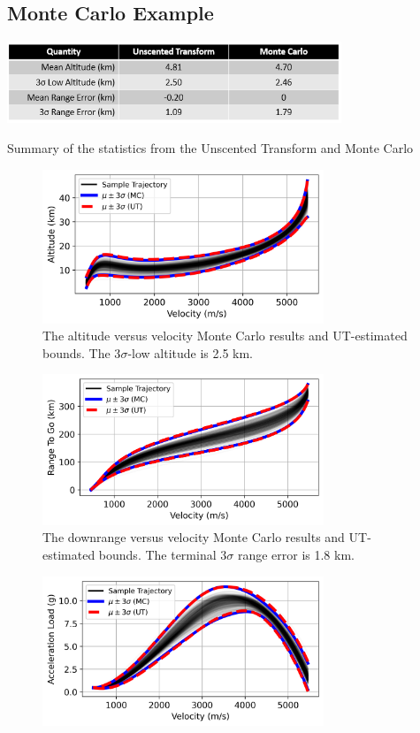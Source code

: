 \documentclass[journal ]{new-aiaa}
\begin{document}
\subsection*{Monte Carlo Example}
\begin{table}[h!]
	\centering
	\includegraphics[width=0.75\textwidth]{ddp/table_mc}
	\caption{Summary of the statistics from the Unscented Transform and Monte Carlo}
	\label{table_mc}
\end{table}
\begin{figure}[h!]
	\centering
	\includegraphics[width=0.75\textwidth]{ddp/python/Altitude}
	\caption{The altitude versus velocity Monte Carlo results and UT-estimated bounds. The 3$ \sigma $-low altitude is 2.5 km.}
	\label{fig_mc_alt}
\end{figure}
\begin{figure}[h!]
	\centering
	\includegraphics[width=0.75\textwidth]{ddp/python/Range}
	\caption{The downrange versus velocity Monte Carlo results and UT-estimated bounds. The terminal 3$ \sigma $ range error is 1.8 km.}
	\label{fig_mc_range}
\end{figure}
\begin{figure}[h!]
	\centering
	\includegraphics[width=0.75\textwidth]{ddp/python/Acceleration}
	\caption{}
	\label{fig_mc_accel}
\end{figure}
\end{document}
